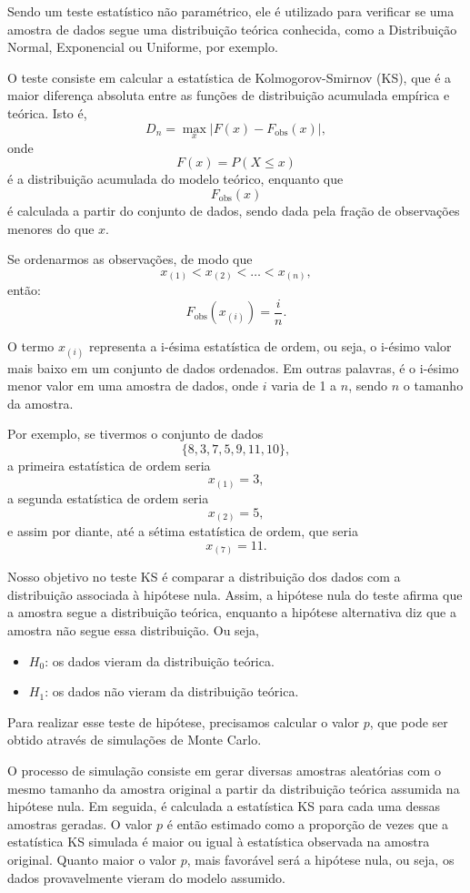 \documentclass{article}
\begin{document}
Sendo um teste estatístico não paramétrico, ele é utilizado para verificar se uma amostra de dados segue uma distribuição teórica conhecida, como a Distribuição Normal, Exponencial ou Uniforme, por exemplo.

O teste consiste em calcular a estatística de Kolmogorov-Smirnov (KS), que é a maior diferença absoluta entre as funções de distribuição acumulada empírica e teórica. Isto é,
    $$
    D_n = \max_x |F(x) - F_{\text{obs}}(x)|,
    $$
onde 
    $$
    F(x) = P(X \leq x)
    $$
é a distribuição acumulada do modelo teórico, enquanto que 
    $$
    F_{\text{obs}}(x)
    $$ 
é calculada a partir do conjunto de dados, sendo dada pela fração de observações menores do que $x$.

Se ordenarmos as observações, de modo que 
    $$
    x_{(1)} < x_{(2)} < \ldots < x_{(n)},
    $$ 
então:
    $$
    F_{\text{obs}}(x_{(i)}) = \frac{i}{n}.
    $$
    
O termo $x_{(i)}$ representa a i-ésima estatística de ordem, ou seja, o i-ésimo valor mais baixo em um conjunto de dados ordenados. Em outras palavras, é o i-ésimo menor valor em uma amostra de dados, onde $i$ varia de 1 a $n$, sendo $n$ o tamanho da amostra.

Por exemplo, se tivermos o conjunto de dados 
    $$
    \{8, 3, 7, 5, 9, 11, 10\},
    $$ 
a primeira estatística de ordem seria 
    $$
    x_{(1)} = 3,
    $$ 
a segunda estatística de ordem seria 
    $$
    x_{(2)} = 5,
    $$ 
e assim por diante, até a sétima estatística de ordem, que seria 
    $$
    x_{(7)} = 11.
    $$
    
Nosso objetivo no teste KS é comparar a distribuição dos dados com a distribuição associada à hipótese nula. Assim, a hipótese nula do teste afirma que a amostra segue a distribuição teórica, enquanto a hipótese alternativa diz que a amostra não segue essa distribuição. Ou seja,
\begin{itemize}
    \item $H_0$: os dados vieram da distribuição teórica.
    \item $H_1$: os dados não vieram da distribuição teórica.
\end{itemize}

Para realizar esse teste de hipótese, precisamos calcular o valor $p$, que pode ser obtido através de simulações de Monte Carlo.

O processo de simulação consiste em gerar diversas amostras aleatórias com o mesmo tamanho da amostra original a partir da distribuição teórica assumida na hipótese nula. Em seguida, é calculada a estatística KS para cada uma dessas amostras geradas. O valor $p$ é então estimado como a proporção de vezes que a estatística KS simulada é maior ou igual à estatística observada na amostra original. Quanto maior o valor $p$, mais favorável será a hipótese nula, ou seja, os dados provavelmente vieram do modelo assumido.
\end{document}

